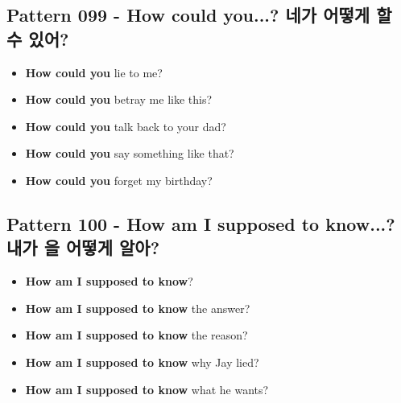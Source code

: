 \documentclass[11pt]{oblivoir}
\begin{document}
\subsection{Pattern 099 - How could you...? 네가 어떻게 \texttildelow 할 수 있어?}
\begin{itemize}
  \item \textbf{How could you} lie to me?
  \item \textbf{How could you} betray me like this?
  \item \textbf{How could you} talk back to your dad?
  \item \textbf{How could you} say something like that?
  \item \textbf{How could you} forget my birthday?
\end{itemize}

\subsection{Pattern 100 - How am I supposed to know...? 내가 \texttildelow 을 어떻게 알아?}
\begin{itemize}
  \item \textbf{How am I supposed to know}?
  \item \textbf{How am I supposed to know} the answer?
  \item \textbf{How am I supposed to know} the reason?
  \item \textbf{How am I supposed to know} why Jay lied?
  \item \textbf{How am I supposed to know} what he wants?
\end{itemize}
\end{document}
